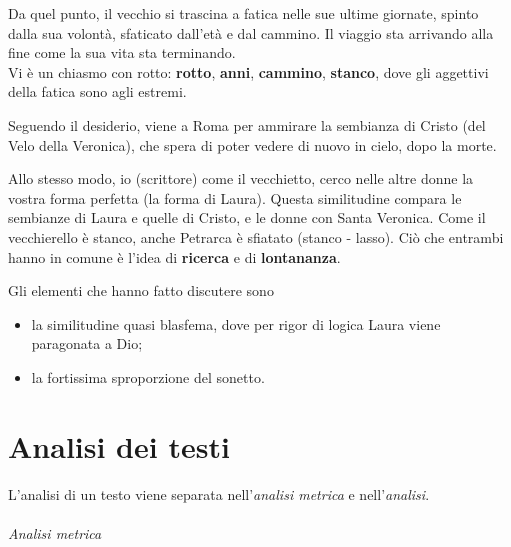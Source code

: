 \documentclass[a4paper]{article}
\begin{document}
Da quel punto, il vecchio si trascina a fatica nelle sue ultime giornate,
spinto dalla sua volontà, sfaticato dall'età e dal cammino.
Il viaggio sta arrivando alla fine come la sua vita sta terminando.\\
Vi è un chiasmo con rotto: \textbf{rotto}, \textbf{anni}, \textbf{cammino}, \textbf{stanco},
dove gli aggettivi della fatica sono agli estremi.

Seguendo il desiderio, viene a Roma per ammirare la sembianza di Cristo (del Velo della Veronica),
che spera di poter vedere di nuovo in cielo, dopo la morte.


Allo stesso modo, io (scrittore) come il vecchietto, cerco nelle altre donne la vostra forma perfetta
(la forma di Laura).
Questa similitudine compara le sembianze di Laura e quelle di Cristo, e le donne con Santa Veronica.
Come il vecchierello è stanco, anche Petrarca è sfiatato (stanco - lasso).
Ciò che entrambi hanno in comune è l'idea di \textbf{ricerca} e di \textbf{lontananza}.

Gli elementi che hanno fatto discutere sono
\begin{itemize}
    \item la similitudine quasi blasfema, dove per rigor di logica Laura viene paragonata a Dio;
    \item la fortissima sproporzione del sonetto.
\end{itemize}



\pagebreak

\part{Analisi dei testi}


L'analisi di un testo viene separata nell'\textit{analisi metrica} e nell'\textit{analisi}.

\paragraph{Analisi metrica}
\end{document}
